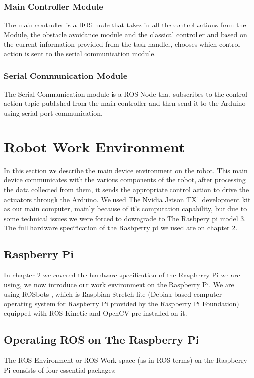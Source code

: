 \subsubsection{Main Controller Module}
 \hspace{2cm}The main controller is a ROS node that takes in all the control actions from the    Module, the obstacle avoidance module and the classical controller and based on the current information provided from the task handler, chooses which control action is sent to the serial communication module.
\subsubsection{Serial Communication Module}
\hspace{2cm}The Serial Communication module is a ROS Node that subscribes to the control action topic published from the main controller and then send it to the Arduino using serial port communication.

\section{Robot Work Environment}
\hspace{2cm}In this section we describe the main device environment on the robot. This main device communicates with the various components of the robot, after processing the data collected from them, it sends the appropriate control action to drive the actuators through the Arduino. We used The Nvidia Jetson TX1 development kit as our main computer, mainly because of it's computation capability, but due to some technical issues we were forced to downgrade to The Rasbpery pi model 3. The full hardware specification of the Rasbperry pi we used are on chapter 2.

\subsection{Raspberry Pi}
\hspace{2cm}In chapter 2 we covered the hardware specification of the Raspberry Pi we are using, we now introduce our work environment on the Raspberry Pi. We are using ROSbots \cite{web024}, which is Raspbian Stretch lite (Debian-based computer operating system for Raspberry Pi provided by the Raspberry Pi Foundation\cite{web025}) equipped with ROS Kinetic\cite{web026} and OpenCV  pre-installed on it.

\subsection{Operating ROS on The Raspberry Pi}
\hspace{2cm}The ROS Environment or ROS Work-space (as in ROS terms) on the Raspberry Pi consists of four essential packages:

